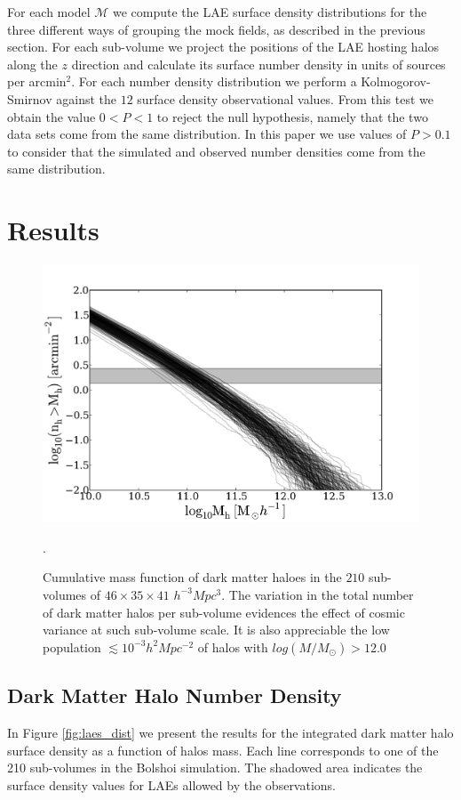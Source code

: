 \documentclass[usenatbib]{mn2e}
\begin{document}
For each model ${\mathcal M}$ we compute the LAE surface density
distributions for the three different ways of grouping the mock
fields, as described in the previous section. For each sub-volume we
project the positions of the LAE hosting halos along the $z$ direction
and calculate its surface number density in units of sources per
arcmin$^{2}$. For each number density distribution we perform a
Kolmogorov-Smirnov against the $12$ surface density observational
values. From this test we obtain the value $0<P<1$ to reject the null
hypothesis, namely that the two data sets come from the same
distribution. In this paper we use values of $P>0.1$ to consider that
the simulated and observed number densities come from the same
distribution. 

\section{Results}


\begin{figure}
\begin{center}
\includegraphics[width=1.00\linewidth,angle=0]{./plots/Fig1.pdf}
\caption{ \label{figure:laes_dist} Cumulative mass function of dark
  matter haloes in the $210$ sub-volumes of $46\times 35\times 41$
  $h^{-3}Mpc^{3}$. The variation in the total number of dark matter
  halos per sub-volume  evidences the effect of cosmic variance at
  such sub-volume scale. It is also appreciable the low population
  $\lesssim10^{-3}h^{2}Mpc^{-2}$ of halos with
  $log(M/M_{\odot})>12.0$}. 
\end{center} 
\end{figure}


\subsection{Dark Matter Halo Number Density}
In Figure \ref{fig:laes_dist} we present the results for  the
integrated dark matter halo surface density as a function of halos
mass. Each line corresponds to one of the 210 sub-volumes in the
Bolshoi simulation. The shadowed area indicates the surface density
values for LAEs allowed by the observations.  
 
\end{document}

